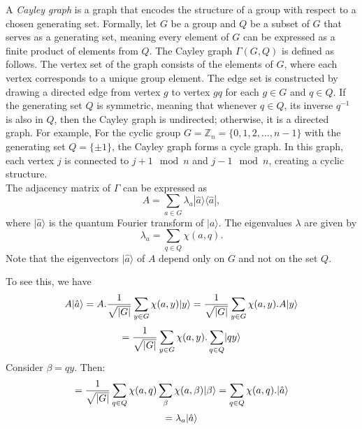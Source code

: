 \documentclass[11pt]{article}
\theoremstyle{definition}
\begin{document}
A \textit{Cayley graph} is a graph that encodes the structure of a group with respect to a chosen generating set. Formally, let \( G \) be a group and \( Q \) be a subset of \( G \) that serves as a generating set, meaning every element of \( G \) can be expressed as a finite product of elements from \( Q \). The Cayley graph \( \Gamma(G, Q) \) is defined as follows. The vertex set of the graph consists of the elements of \( G \), where each vertex corresponds to a unique group element. The edge set is constructed by drawing a directed edge from vertex \( g \) to vertex \( gq \) for each \( g \in G \) and \( q \in Q \). If the generating set \( Q \) is symmetric, meaning that whenever \( q \in Q \), its inverse \( q^{-1} \) is also in \( Q \), then the Cayley graph is undirected; otherwise, it is a directed graph.
For example, For the cyclic group \( G = \mathbb{Z}_n = \{0,1,2,\dots, n-1\} \) with the generating set \( Q = \{\pm 1\} \), the Cayley graph forms a cycle graph. In this graph, each vertex \( j \) is connected to \( j+1 \mod n \) and \( j-1 \mod n \), creating a cyclic structure.\\


The adjacency matrix of $\Gamma$ can be expressed as
\[
A = \sum_{a \in G} \lambda_a |\hat{a}\rangle \langle \hat{a}|,
\]
where $|\hat{a}\rangle$ is the quantum Fourier transform of $|a\rangle$. The eigenvalues $\lambda$ are given by
\[
\lambda_a = \sum_{q \in Q} \chi(a, q).
\]
Note that the eigenvectors $|\hat{a}\rangle$ of $A$ depend only on $G$ and not on the set $Q$.

To see this, we have
\[
        A\lvert\hat{a}\rangle = A.\frac{1}{\sqrt{|G|}}\sum_{y \in G}\chi(a,y)\lvert y\rangle = \frac{1}{\sqrt{|G|}}\sum_{y \in G}\chi(a,y).A\lvert y\rangle
        \]
        \[
        = \frac{1}{\sqrt{|G|}}\sum_{y \in G}\chi(a,y).\sum_{q \in Q}\lvert qy\rangle
        \]
        Consider $\beta = qy$. Then:
        \[
         = \frac{1}{\sqrt{|G|}}\sum_{q \in Q}\chi(a,q)\sum_{\beta}\chi(a,\beta)\lvert\beta\rangle = \sum_{q \in Q}\chi(a,q) . \lvert\hat{a}\rangle
        \]
        \[
         = \lambda_a\lvert\hat{a}\rangle
        \]
\end{document}

